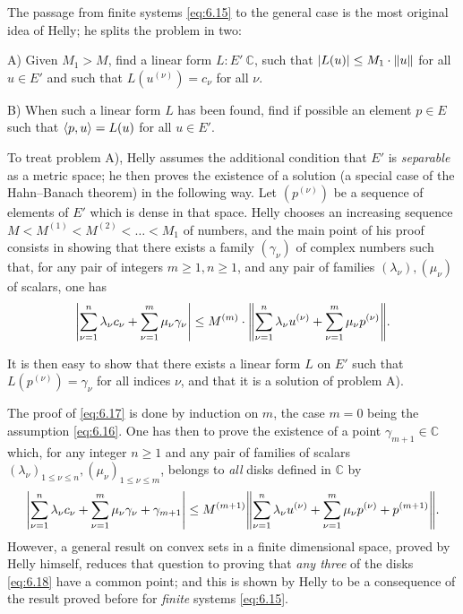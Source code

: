 \documentclass[12pt,a4paper,leqno,twoside]{extbook}
\DeclarePairedDelimiter{\norm}{\lVert}{\rVert}
\DeclarePairedDelimiter{\ip}{\langle}{\rangle}
\newcommand{\C}{\mathbb{C}}
\begin{document}
The passage from finite systems \eqref{eq:6.15} to the general case is the most original idea of Helly; he splits the problem in two:

A) Given \(M_1 > M\), find a linear form \(L: E' \ \C\), such that \(|L(u)| \leq M_1 \cdot \norm{u}\) for all \(u \in E'\) and such that \(L(u^{(\nu)}) = c_\nu\) for all \(\nu\).

B) When such a linear form \(L\) has been found, find if possible an element \(p \in E\) such that \(\ip{p,u} = L(u)\) for all \(u \in E'\).

To treat problem A), Helly assumes the additional condition that \(E'\) is \emph{separable} as a metric space; he then proves the existence of a solution (a special case of the Hahn--Banach theorem) in the following way. Let \((p^{(\nu)})\) be a sequence of elements of \(E'\) which is dense in that space. Helly chooses an increasing sequence \(M < M^{(1)} < M^{(2)} < \ldots < M_1\) of numbers, and the main point of his proof consists in showing that there exists a family \((\gamma_\nu)\) of complex numbers such that, for any pair of integers \(m \geq 1, n \geq 1\), and any pair of families \((\lambda_\nu), (\mu_\nu)\) of scalars, one has
\begin{equation}
    \label{eq:6.17}
    \left| \sum_{\nu = 1}^n \lambda_\nu c_\nu + \sum_{\nu = 1}^m \mu_\nu \gamma_\nu \right| \leq M^{(m)} \cdot \norm*{\sum_{\nu = 1}^n \lambda_\nu u^{(\nu)} + \sum_{\nu = 1}^m \mu_\nu p^{(\nu)}}.
\end{equation}

It is then easy to show that there exists a linear form \(L\) on \(E'\) such that \(L(p^{(\nu)}) = \gamma_\nu\) for all indices \(\nu\), and that it is a solution of problem A).

The proof of \eqref{eq:6.17} is done by induction on \(m\), the case \(m = 0\) being the assumption \eqref{eq:6.16}. One has then to prove the existence of a point \(\gamma_{m+1} \in \C\) which, for any integer \(n \geq 1\) and any pair of families of scalars \((\lambda_\nu)_{1 \leq \nu \leq n}, (\mu_\nu)_{1 \leq \nu \leq m}\), belongs to \emph{all} disks defined in \(\C\) by
\begin{equation}
    \label{eq:6.18}
        \left| \sum_{\nu = 1}^n \lambda_\nu c_\nu + \sum_{\nu = 1}^m \mu_\nu \gamma_\nu + \gamma_{m+1} \right| \leq M^{(m+1)} \norm*{\sum_{\nu = 1}^n \lambda_\nu u^{(\nu)} + \sum_{\nu = 1}^m \mu_\nu p^{(\nu)} + p^{(m+1)}}.
\end{equation}
However, a general result on convex sets in a finite dimensional space, proved by Helly himself, reduces that question to proving that \emph{any three} of the disks \eqref{eq:6.18} have a common point; and this is shown by Helly to be a consequence of the result proved before for \emph{finite} systems \eqref{eq:6.15}.
\end{document}
